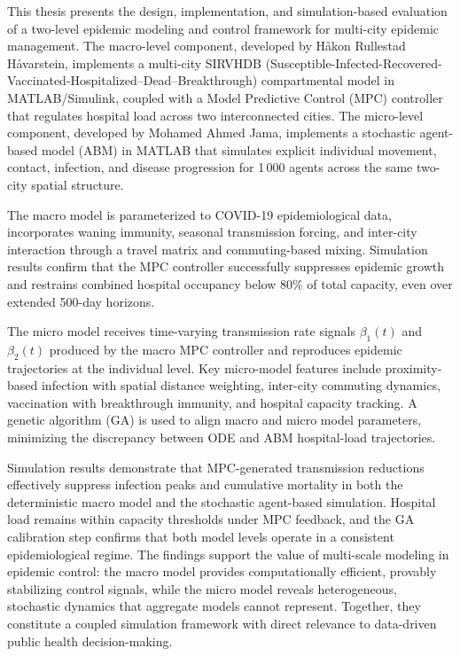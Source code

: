 

\abstract

This thesis presents the design, implementation, and simulation-based evaluation of a two-level epidemic modeling and control framework for multi-city epidemic management.
The macro-level component, developed by H\aa{}kon Rullestad H\aa{}varstein, implements a multi-city SIRVHDB (Susceptible-Infected-Recovered-Vaccinated-Hospitalized--Dead--Breakthrough) compartmental model in MATLAB/Simulink, coupled with a Model Predictive Control (MPC) controller that regulates hospital load across two interconnected cities.
The micro-level component, developed by Mohamed Ahmed Jama, implements a stochastic agent-based model (ABM) in MATLAB that simulates explicit individual movement, contact, infection, and disease progression for 1\,000 agents across the same two-city spatial structure.

The macro model is parameterized to COVID-19 epidemiological data, incorporates waning immunity, seasonal transmission forcing, and inter-city interaction through a travel matrix and commuting-based mixing.
Simulation results confirm that the MPC controller successfully suppresses epidemic growth and restrains combined hospital occupancy below 80\% of total capacity, even over extended 500-day horizons.

The micro model receives time-varying transmission rate signals $\beta_1(t)$ and $\beta_2(t)$ produced by the macro MPC controller and reproduces epidemic trajectories at the individual level.
Key micro-model features include proximity-based infection with spatial distance weighting, inter-city commuting dynamics, vaccination with breakthrough immunity, and hospital capacity tracking.
A genetic algorithm (GA) is used to align macro and micro model parameters, minimizing the discrepancy between ODE and ABM hospital-load trajectories.

Simulation results demonstrate that MPC-generated transmission reductions effectively suppress infection peaks and cumulative mortality in both the deterministic macro model and the stochastic agent-based simulation.
Hospital load remains within capacity thresholds under MPC feedback, and the GA calibration step confirms that both model levels operate in a consistent epidemiological regime.
The findings support the value of multi-scale modeling in epidemic control: the macro model provides computationally efficient, provably stabilizing control signals, while the micro model reveals heterogeneous, stochastic dynamics that aggregate models cannot represent.
Together, they constitute a coupled simulation framework with direct relevance to data-driven public health decision-making.
